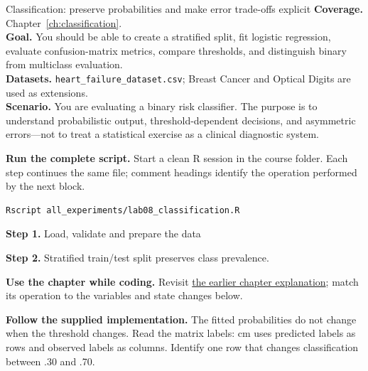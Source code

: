 
\begin{labproject}{Classification: preserve probabilities and make error trade-offs explicit}
\textbf{Coverage.} Chapter~\ref{ch:classification}.\\
\textbf{Goal.} You should be able to create a stratified split, fit logistic regression, evaluate confusion-matrix metrics, compare thresholds, and distinguish binary from multiclass evaluation.\\
\textbf{Datasets.} \texttt{heart\_failure\_dataset.csv}; Breast Cancer and Optical Digits are used as extensions.\\
\textbf{Scenario.} You are evaluating a binary risk classifier. The purpose is to understand probabilistic output, threshold-dependent decisions, and asymmetric errors---not to treat a statistical exercise as a clinical diagnostic system.



\textbf{Run the complete script.} Start a clean R session in the course folder. Each step continues the same file; comment headings identify the operation performed by the next block.
\begin{lstlisting}[style=utpterminal]
Rscript all_experiments/lab08_classification.R
\end{lstlisting}

\noindent\textbf{Step 1.} Load, validate and prepare the data


\noindent\textbf{Step 2.} Stratified train/test split preserves class prevalence.




\textbf{Use the chapter while coding.} Revisit \hyperref[ch:classification]{the earlier chapter explanation}; match its operation to the variables and state changes below.

\textbf{Follow the supplied implementation.} The fitted probabilities do not change when the threshold changes. Read the matrix labels: cm uses predicted labels as rows and observed labels as columns. Identify one row that changes classification between .30 and .70.





\end{labproject}
